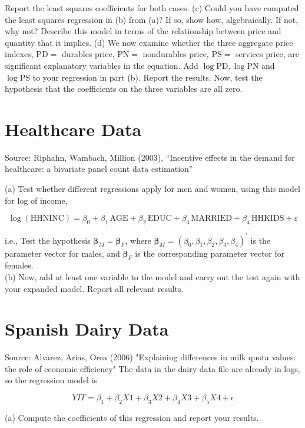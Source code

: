 \documentclass[11pt]{article}
\begin{document}
Report the least squares coefficients for both cases.
(c) Could you have computed the least squares regression in (b) from (a)? If so, show how, algebraically. If not, why not? Describe this model in terms of the relationship between price and quantity that it implies.
(d) We now examine whether the three aggregate price indexes, $\mathrm{PD}=$ durables price, $\mathrm{PN}=$ nondurables price, $\mathrm{PS}=$ services price, are significant explanatory variables in the equation. Add $\log \mathrm{PD}, \log \mathrm{PN}$ and $\log \mathrm{PS}$ to your regression in part (b). Report the results. Now, test the hypothesis that the coefficients on the three variables are all zero.

\section{Healthcare Data}
Source: Riphahn, Wambach, Million (2003), “Incentive effects in the demand for healthcare: a bivariate panel count data estimation''

(a) Test whether different regressions apply for men and women, using this model for log of income,

$$
\log (\mathrm{HHNINC})=\beta_0+\beta_1\, \mathrm{AGE}+\beta_2\, \mathrm{EDUC}+\beta_3\, \mathrm{MARRIED}+\beta_4\, \mathrm{HHKIDS}+\varepsilon
$$

i.e., Test the hypothesis $\boldsymbol{\beta}_M=\boldsymbol{\beta}_F$, where $\boldsymbol{\beta}_M=\left(\beta_0, \beta_1, \beta_2, \beta_3, \beta_4\right)^{\prime}$ is the parameter vector for males, and $\boldsymbol{\beta}_F$ is the corresponding parameter vector for females.\\

(b) Now, add at least one variable to the model and carry out the test again with your expanded model. Report all relevant results.


\section{Spanish Dairy Data}

Source: Alvarez, Arias, Orea (2006) "Explaining differences in milk quota values: the role of economic efficiency"
The data in the dairy data file are already in logs, so the regression model is

$$
Y I T=\beta_1+\beta_2 X 1+\beta_3 X 2+\beta_4 X 3+\beta_5 X 4+\epsilon
$$

(a) Compute the coefficients of this regression and report your results.\\
\end{document}
